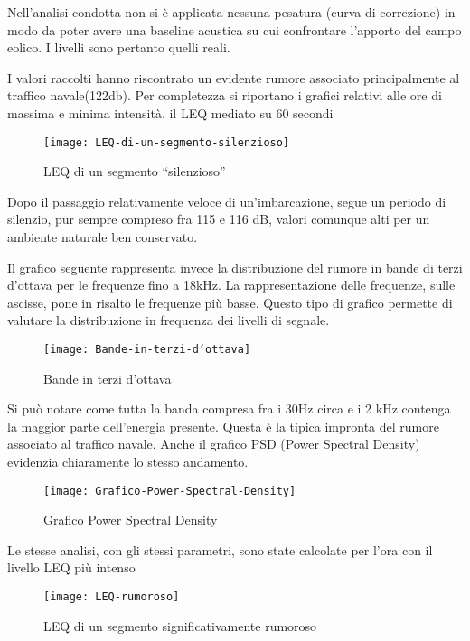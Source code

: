 Nell’analisi condotta non si è applicata nessuna pesatura (curva di correzione) in modo da poter avere una baseline acustica su cui confrontare l’apporto del campo eolico. 
I livelli sono pertanto quelli reali.

I valori raccolti hanno riscontrato un evidente rumore associato principalmente al traffico navale(122db). 
Per completezza si riportano i grafici relativi alle ore di massima e minima intensità. il LEQ mediato su 60 secondi 

\begin{figure}[h]
\centering
\texttt{[image: LEQ-di-un-segmento-silenzioso]}
\caption{LEQ di un segmento “silenzioso”}
\end{figure}

Dopo il passaggio relativamente veloce di un’imbarcazione, segue un periodo di silenzio, pur sempre compreso fra 115 e 116 dB, valori comunque alti per un ambiente naturale ben conservato.

Il grafico seguente rappresenta invece la distribuzione del rumore in bande di terzi d’ottava per le frequenze fino a 18kHz. 
La rappresentazione delle frequenze, sulle ascisse, pone in risalto le frequenze più basse. 
Questo tipo di grafico permette di valutare la distribuzione in frequenza dei livelli di segnale.

\begin{figure}[h]
\centering
\texttt{[image: Bande-in-terzi-d'ottava]}
\caption{Bande in terzi d’ottava}
\end{figure}

Si può notare come tutta la banda compresa fra i 30Hz circa e i 2 kHz contenga la maggior parte dell’energia presente. 
Questa è la tipica impronta del rumore associato al traffico navale. 
Anche il grafico PSD (Power Spectral Density) evidenzia chiaramente lo stesso andamento.

\begin{figure}[h]
\centering
\texttt{[image: Grafico-Power-Spectral-Density]}
\caption{Grafico Power Spectral Density}
\end{figure}

Le stesse analisi, con gli stessi parametri, sono state calcolate per l’ora con il livello LEQ più intenso 

\begin{figure}[h]
\centering
\texttt{[image: LEQ-rumoroso]}
\caption{LEQ di un segmento significativamente rumoroso}
\end{figure}

